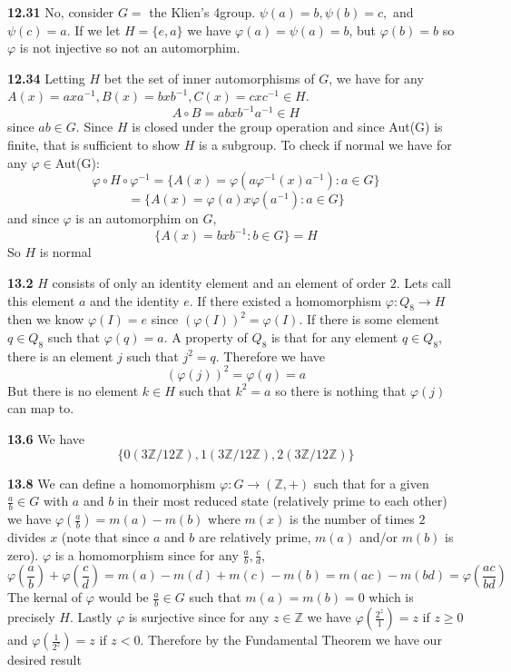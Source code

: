 \documentclass[12pt]{article}
\newenvironment{ques}{\vspace{2 ex}}{\vspace{2 ex}}
\theoremstyle{definition}
\begin{document}
\begin{ques}
	\textbf{12.31}
		No, consider $G=$ the Klien's 4group. $\psi(a) = b, \psi(b) =
		c,$ and $\psi(c) = a$. If we let $H = \{e, a\}$ we have
		$\varphi(a) = \psi(a) = b$, but $\varphi(b) = b$ so $\varphi$
		is not injective so not an automorphim.
\end{ques}

\begin{ques}
	\textbf{12.34}
		Letting $H$ bet the set of inner automorphisms of $G$, we have for any
		$A(x) = axa^{-1}, B(x) = bxb^{-1}, C(x) = cxc^{-1} \in H$. 
		$$A \circ B = abxb^{-1}a^{-1} \in H$$
		since $ab \in G$. Since $H$ is closed under the group operation
		and since Aut(G) is finite, that is sufficient to show $H$ is a
		subgroup. To check if normal we have for any $\varphi \in $Aut(G):
		$$\varphi \circ H \circ \varphi^{-1} = \{A(x) = \varphi(a
		\varphi^{-1}(x) a^{-1}): a \in G\}$$
		$$= \{A(x) = \varphi(a)x\varphi(a^{-1}): a\in G\}$$
		and since $\varphi$ is an automorphim on $G$,
		$$\{A(x) = bx b^{-1}: b\in G\} = H$$
		So $H$ is normal
\end{ques}

\begin{ques}
	\textbf{13.2}
		$H$ consists of only an identity element and an element of
		order $2$. Lets call this element $a$ and the identity $e$.
		If there existed a homomorphism $\varphi : Q_8 \to H$ then we know
		$\varphi(I) = e$ since $(\varphi(I))^2 = \varphi(I)$. If there is some
		element $q \in Q_8$ such that $\varphi(q) = a$. A property of
		$Q_8$ is that for any element $q \in Q_8$, there is an element
		$j$ such that $j^2 = q$. Therefore we have
		$$(\varphi(j))^2 = \varphi(q) = a$$
		But there is no element $k \in H$ such that $k^2 = a$ so there
		is nothing that $\varphi(j)$ can map to.
\end{ques}

\begin{ques}
	\textbf{13.6} 
		We have 
		$$\{0(3\mathbb{Z}/12\mathbb{Z}), 1(3\mathbb{Z}/12\mathbb{Z}),
		2(3\mathbb{Z}/12\mathbb{Z})\}$$
\end{ques}

\begin{ques} 
	\textbf{13.8} 
		We can define a homomorphism $\varphi: G \to (\mathbb{Z}, +)$
		such that for a given $\frac a b \in G$ with $a$ and $b$ in
		their most reduced state (relatively prime to each other) we
		have $\varphi(\frac a b) = m(a) - m(b)$ where $m(x)$ is the number of
		times $2$ divides $x$ (note that since $a$ and $b$ are
		relatively prime, $m(a)$ and/or $m(b)$ is zero). $\varphi$ is a
		homomorphism since for any $\frac{a}{b},
		\frac{c}{d}$, 
		$$\varphi(\frac a b) + \varphi(\frac c d) = m(a) - m(d) + m(c)
		- m(b)=  m(ac) - m(bd) = \varphi(\frac{ac}{bd})$$
		The kernal of $\varphi$ would be $\frac{a}{b} \in G$ such that
		$m(a) = m(b) = 0$ which is precisely $H$. Lastly $\varphi$ is
		surjective since for any $z \in \mathbb{Z}$ we have
		$\varphi(\frac{2^z}{1}) = z$ if $z \geq 0$ and
		$\varphi(\frac{1}{2^z}) = z$ if $z < 0$. Therefore by the
		Fundamental Theorem we have our desired result
		
\end{ques}
\end{document}
